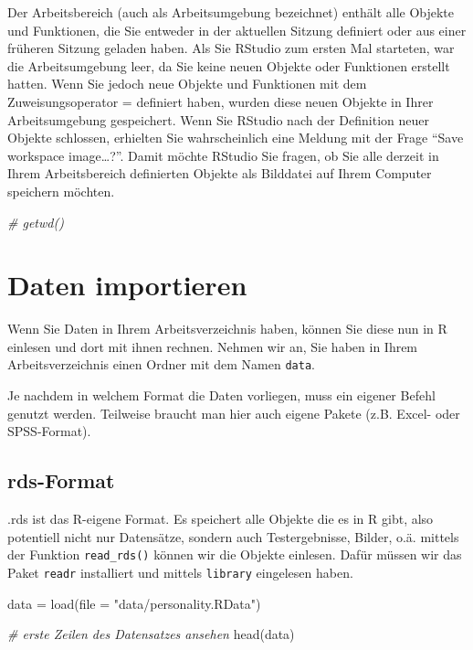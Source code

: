 \documentclass[
]{book}
\newenvironment{Shaded}{\begin{snugshade}}{\end{snugshade}}
\newcommand{\AttributeTok}[1]{\textcolor[rgb]{0.77,0.63,0.00}{#1}}
\newcommand{\CommentTok}[1]{\textcolor[rgb]{0.56,0.35,0.01}{\textit{#1}}}
\newcommand{\FunctionTok}[1]{\textcolor[rgb]{0.00,0.00,0.00}{#1}}
\newcommand{\NormalTok}[1]{#1}
\newcommand{\OtherTok}[1]{\textcolor[rgb]{0.56,0.35,0.01}{#1}}
\newcommand{\StringTok}[1]{\textcolor[rgb]{0.31,0.60,0.02}{#1}}
\begin{document}
Der Arbeitsbereich (auch als Arbeitsumgebung bezeichnet) enthält alle Objekte und Funktionen, die Sie entweder in der aktuellen Sitzung definiert oder aus einer früheren Sitzung geladen haben. Als Sie RStudio zum ersten Mal starteten, war die Arbeitsumgebung leer, da Sie keine neuen Objekte oder Funktionen erstellt hatten. Wenn Sie jedoch neue Objekte und Funktionen mit dem Zuweisungsoperator = definiert haben, wurden diese neuen Objekte in Ihrer Arbeitsumgebung gespeichert. Wenn Sie RStudio nach der Definition neuer Objekte schlossen, erhielten Sie wahrscheinlich eine Meldung mit der Frage ``Save workspace image\ldots?''. Damit möchte RStudio Sie fragen, ob Sie alle derzeit in Ihrem Arbeitsbereich definierten Objekte als Bilddatei auf Ihrem Computer speichern möchten.

\begin{Shaded}
\begin{Highlighting}[]
\CommentTok{\# getwd()}
\end{Highlighting}
\end{Shaded}

\hypertarget{daten-importieren}{%
\section{Daten importieren}\label{daten-importieren}}

Wenn Sie Daten in Ihrem Arbeitsverzeichnis haben, können Sie diese nun in R einlesen und dort mit ihnen rechnen. Nehmen wir an, Sie haben in Ihrem Arbeitsverzeichnis einen Ordner mit dem Namen \texttt{data}.

Je nachdem in welchem Format die Daten vorliegen, muss ein eigener Befehl genutzt werden. Teilweise braucht man hier auch eigene Pakete (z.B. Excel- oder SPSS-Format).

\hypertarget{rds-format}{%
\subsection{rds-Format}\label{rds-format}}

.rds ist das R-eigene Format. Es speichert alle Objekte die es in R gibt, also potentiell nicht nur Datensätze, sondern auch Testergebnisse, Bilder, o.ä. mittels der Funktion \texttt{read\_rds()} können wir die Objekte einlesen. Dafür müssen wir das Paket \texttt{readr} installiert und mittels \texttt{library} eingelesen haben.

\begin{Shaded}
\begin{Highlighting}[]
\NormalTok{data }\OtherTok{=} \FunctionTok{load}\NormalTok{(}\AttributeTok{file =} \StringTok{"data/personality.RData"}\NormalTok{)}

\CommentTok{\# erste Zeilen des Datensatzes ansehen}
\FunctionTok{head}\NormalTok{(data)}
\end{Highlighting}
\end{Shaded}
\end{document}
